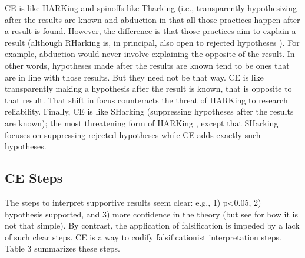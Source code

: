 \documentclass[empirical, authordate, meta]{jote-new-article}
\begin{document}
CE is like HARKing and spinoffs like Tharking (i.e., transparently hypothesizing after the results are known \parencite{Hollenbeck2017, Rubin2017} and abduction \parencite{Locke2008, Schwab2017} in that all those practices happen after a result is found. However, the difference is that those practices aim to explain a result (although RHarking is, in principal, also open to rejected hypotheses \parencite{Rubin2017}). For example, abduction would never involve explaining the opposite of the result. In other words, hypotheses made after the results are known tend to be ones that are in line with those results. But they need not be that way. CE is like transparently making a hypothesis after the result is known, that is opposite to that result. That shift in focus counteracts the threat of HARKing to research reliability. Finally, CE is like SHarking (suppressing hypotheses after the results are known); the most threatening form of HARKing \parencite{Rubin2017}, except that SHarking focuses on suppressing rejected hypotheses while CE adds exactly such hypotheses.



\subsection{CE Steps}

The steps to interpret supportive results seem clear: e.g., 1) p<0.05, 2) hypothesis supported, and 3) more confidence in the theory (but see \textcite{Wasserstein2019} for how it is not that simple). By contrast, the application of falsification is impeded by a lack of such clear steps. CE is a way to codify falsificationist interpretation steps. Table 3 summarizes these steps. 
\end{document}
